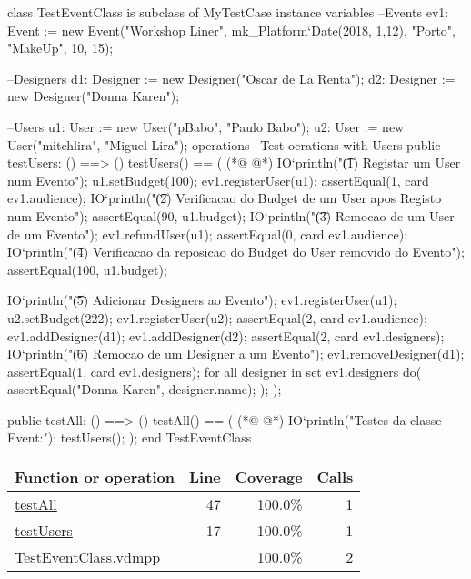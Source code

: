 \begin{vdmpp}[breaklines=true]
class TestEventClass is subclass of MyTestCase
instance variables
 --Events
 ev1: Event := new Event("Workshop Liner", mk_Platform`Date(2018, 1,12), "Porto", "MakeUp", 10, 15);
 
 --Designers
 d1: Designer := new Designer("Oscar de La Renta");
 d2: Designer := new Designer("Donna Karen");
 
 --Users
 u1: User := new User("pBabo", "Paulo Babo");
 u2: User := new User("mitchlira", "Miguel Lira");
operations
 --Test oerations with Users
 public testUsers: () ==> ()
 testUsers() == (
(*@
\label{testUsers:17}
@*)
  IO`println("\t (1) Registar um User num Evento");
  u1.setBudget(100);
  ev1.registerUser(u1);
  assertEqual(1, card ev1.audience);
  IO`println("\t (2) Verificacao do Budget de um User apos Registo num Evento");
  assertEqual(90, u1.budget);
  IO`println("\t (3) Remocao de um User de um Evento");
  ev1.refundUser(u1);
  assertEqual(0, card ev1.audience);
  IO`println("\t (4) Verificacao da reposicao do Budget do User removido do Evento");
  assertEqual(100, u1.budget);
  
  IO`println("\t (5) Adicionar Designers ao Evento");
  ev1.registerUser(u1);
  u2.setBudget(222);
  ev1.registerUser(u2);
  assertEqual(2, card ev1.audience);
  ev1.addDesigner(d1);
  ev1.addDesigner(d2);
  assertEqual(2, card ev1.designers);
  IO`println("\t (6) Remocao de um Designer a um Evento");
  ev1.removeDesigner(d1);
  assertEqual(1, card ev1.designers);
  for all designer in set ev1.designers do(
   assertEqual("Donna Karen", designer.name);
  );
 );
 
 public testAll: () ==> ()
  testAll() == (
(*@
\label{testAll:47}
@*)
  IO`println("Testes da classe Event:");
  testUsers();
  );
end TestEventClass
\end{vdmpp}
\bigskip
\begin{longtable}{|l|r|r|r|}
\hline
Function or operation & Line & Coverage & Calls \\
\hline
\hline
\hyperref[testAll:47]{testAll} & 47&100.0\% & 1 \\
\hline
\hyperref[testUsers:17]{testUsers} & 17&100.0\% & 1 \\
\hline
\hline
TestEventClass.vdmpp & & 100.0\% & 2 \\
\hline
\end{longtable}

